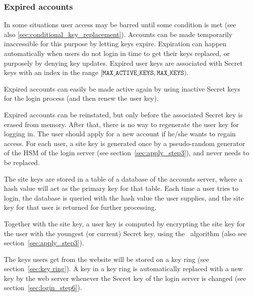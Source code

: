\subsubsection{Expired accounts}
In some situations user access may be barred until some condition is met
(see also \vref{sec:conditional_key_replacement}).
Accounts can be made temporarily inaccessible for this purpose by letting keys expire.
Expiration can happen automatically when users do not login in time to get their keys replaced,
or purposely by denying key updates.
Expired user keys are associated with Secret keys with an index in the range $[\texttt{MAX\_ACTIVE\_KEYS},\texttt{MAX\_KEYS})$.
\par
Expired accounts can easily be made active again by using inactive Secret keys for the login process
(and then renew the user key).
\par
Expired accounts can be reinstated,
but only before the associated Secret key is erased from memory.
After that, there is no way to regenerate the user key for logging in.
The user should apply for a new account if he/she wants to regain access.
For each user,
a site key is generated once by a pseudo-random generator of the HSM of the login server
(see section~\vref{sec:apply_step3}),
and never needs to be replaced.
\par
The site keys are stored in a table of a database of the accounts server,
where a hash value will act as the primary key for that table.
Each time a user tries to login,
the database is queried with the hash value the user supplies,
and the site key for that user is returned for further processing.

\label{sec:userkeys}
Together with the site key,
a user key is computed by encrypting the site key for the user with the youngest
(or current)
Secret key,
using the \AES\ algorithm
(also see section~\vref{sec:apply_step3}).
\par
The keys users get from the website will be stored on a key ring (see section~\vref{sec:key ring}).
A key in a key ring is automatically replaced with a new key by the web server
whenever the Secret key of the login server is changed
(see section~\vref{sec:login_step6}).

